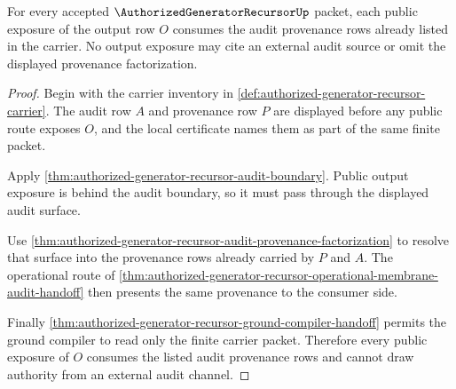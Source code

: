 \begin{theorem}
\label{thm:authorized-generator-recursor-audit-provenance-cover}
For every accepted $\AuthorizedGeneratorRecursorUp$ packet, each public
exposure of the output row $O$ consumes the audit provenance rows already
listed in the carrier. No output exposure may cite an external audit source or
omit the displayed provenance factorization.
\end{theorem}
\begin{proof}
Begin with the carrier inventory in
\autoref{def:authorized-generator-recursor-carrier}. The audit row $A$ and
provenance row $P$ are displayed before any public route exposes $O$, and the
local certificate names them as part of the same finite packet.

Apply \autoref{thm:authorized-generator-recursor-audit-boundary}. Public
output exposure is behind the audit boundary, so it must pass through the
displayed audit surface.

Use
\autoref{thm:authorized-generator-recursor-audit-provenance-factorization} to
resolve that surface into the provenance rows already carried by $P$ and $A$.
The operational route of
\autoref{thm:authorized-generator-recursor-operational-membrane-audit-handoff}
then presents the same provenance to the consumer side.

Finally
\autoref{thm:authorized-generator-recursor-ground-compiler-handoff} permits
the ground compiler to read only the finite carrier packet. Therefore every
public exposure of $O$ consumes the listed audit provenance rows and cannot
draw authority from an external audit channel.
\end{proof}
